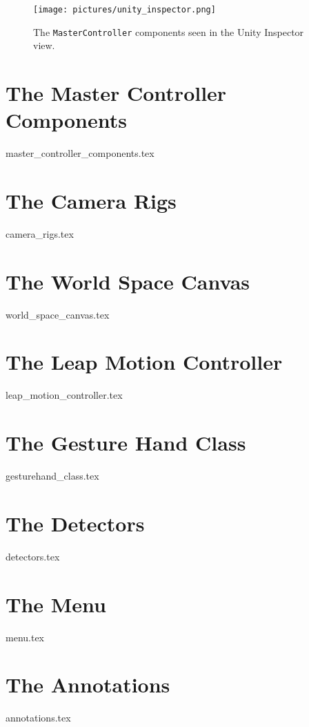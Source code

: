 \begin{figure}%
	\texttt{[image: pictures/unity\_inspector.png]}
	\caption[The \texttt{MasterController} components]{The \texttt{MasterController} components seen in the Unity Inspector view.}
	\label{fig:unity_inspector}
\end{figure} 




\section{The Master Controller Components}
{master_controller_components.tex}


\section{The Camera Rigs}
\label{sec:camera_rigs}
{camera_rigs.tex}


\section{The World Space Canvas}
{world_space_canvas.tex}


\section{The Leap Motion Controller}
{leap_motion_controller.tex}


\section{The Gesture Hand Class}
{gesturehand_class.tex}
 

\section{The Detectors}
{detectors.tex}


\section{The Menu}
{menu.tex}


\section{The Annotations}
{annotations.tex}


